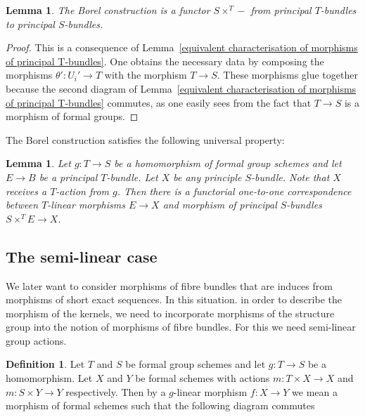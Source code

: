 \documentclass[11pt,oneside]{amsart}
\newtheorem{lemma}[theorem]{Lemma}
\theoremstyle{definition}
\newtheorem{definition}[theorem]{Definition}
\theoremstyle{remark}
\begin{document}
	
	\begin{lemma}\label{change of fibre is functorial}
		The Borel construction is a functor $S\times^T -$ from principal $T$-bundles to principal $S$-bundles.
	\end{lemma}
	\begin{proof}
		This is a consequence of Lemma~\ref{equivalent characterisation of morphisms of principal T-bundles}. One obtains the necessary data by composing the morphisms $\theta':U_i'\rightarrow T$ with the morphism $T\rightarrow S$. These morphisms glue together because the second diagram of Lemma~\ref{equivalent characterisation of morphisms of principal T-bundles} commutes, as one easily sees from the fact that $T\rightarrow S$ is a morphism of formal groups. 
	\end{proof}
	
	The Borel construction satisfies the following universal property:
	\begin{lemma}\label{universal property of associated fibre construction for principal bundles}
		Let $g:T\rightarrow S$ be a homomorphism of formal group schemes and let $E\rightarrow B$ be a principal $T$-bundle. Let $X$ be any principle $S$-bundle. Note that $X$ receives a $T$-action from $g$. Then there is a functorial one-to-one correspondence between $T$-linear morphisms $E\rightarrow X$ and morphism of principal $S$-bundles $S\times^T E\rightarrow X$.
	\end{lemma}
	
	\subsection{The semi-linear case}
	We later want to consider morphisms of fibre bundles that are induces from morphisms of short exact sequences. In this situation. in order to describe the morphism of the kernels, we need to incorporate morphisms of the structure group into the notion of morphisms of fibre bundles. For this we need semi-linear group actions.
	\begin{definition}
		Let $T$ and $S$ be formal group schemes and let $g:T\rightarrow S$ be a homomorphism. Let $X$ and $Y$ be formal schemes with actions $m:T\times X\rightarrow X$ and $m:S\times Y\rightarrow Y$ respectively. Then by a $g$-linear morphism $f:X\rightarrow Y$ we mean a morphism of formal schemes such that the following diagram commutes
		\begin{center}
		\end{center}
	\end{definition}
	
\end{document}
